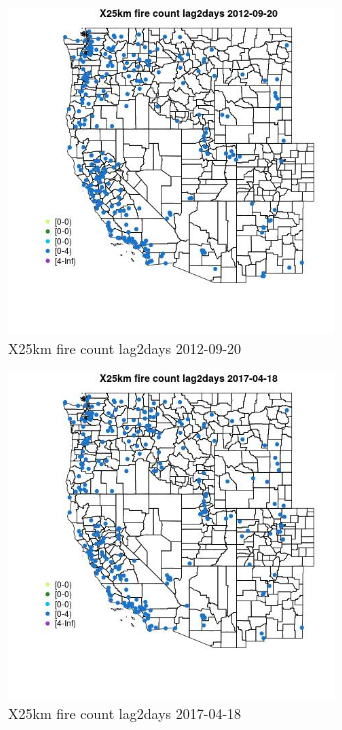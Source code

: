 \begin{figure} 
\centering  
\includegraphics[width=0.77\textwidth]{Code_Outputs/Report_ML_input_PM25_Step4_part_e_de_duplicated_aves_compiled_2019-05-14wNAs_MapObsX25km_fire_count_lag2days2012-09-20.jpg} 
\caption{\label{fig:Report_ML_input_PM25_Step4_part_e_de_duplicated_aves_compiled_2019-05-14wNAsMapObsX25km_fire_count_lag2days2012-09-20}X25km fire count lag2days 2012-09-20} 
\end{figure} 
 

\begin{figure} 
\centering  
\includegraphics[width=0.77\textwidth]{Code_Outputs/Report_ML_input_PM25_Step4_part_e_de_duplicated_aves_compiled_2019-05-14wNAs_MapObsX25km_fire_count_lag2days2017-04-18.jpg} 
\caption{\label{fig:Report_ML_input_PM25_Step4_part_e_de_duplicated_aves_compiled_2019-05-14wNAsMapObsX25km_fire_count_lag2days2017-04-18}X25km fire count lag2days 2017-04-18} 
\end{figure} 
 

